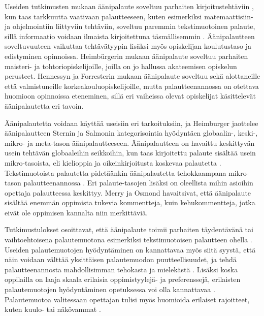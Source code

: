 \documentclass[utf8]{gradu3}
\begin{document}
Useiden tutkimusten mukaan äänipalaute soveltuu parhaiten kirjoitustehtäviin \parencite[][]{academics, engaging, using}, kun taas tarkkuutta vaativaan palautteeseen, kuten esimerkiksi matemaattisiin- ja ohjelmointiin liittyviin tehtäviin, soveltuu paremmin tekstimuotoinen palaute, sillä informaatio voidaan ilmaista kirjoitettuna täsmällisemmin \parencite[][]{academics}. Äänipalautteen soveltuvuuteen vaikuttaa tehtävätyypin lisäksi myös opiskelijan koulutustaso ja edistyminen opinnoissa. Heimbürgerin \parencite[][]{using} mukaan äänipalaute soveltuu parhaiten maisteri- ja tohtoriopiskelijoille, joilla on jo hallussa akateemisen opiskelun perusteet. Hennessyn ja Forresterin \parencite[][]{developing} mukaan äänipalaute soveltuu sekä alottaneille että valmistuneille korkeakouluopiskelijoille, mutta palautteenannossa on otettava huomioon opinnoissa eteneminen, sillä eri vaiheissa olevat opiskelijat käsittelevät äänipalautetta eri tavoin.

Äänipalautetta voidaan käyttää useisiin eri tarkoituksiin, ja Heimburger \parencite[][]{using} jaottelee äänipalautteen Sternin ja Salmonin \parencite[][]{stern} kategorisointia hyödyntäen globaalin-, keski-, mikro- ja meta-tason äänipalautteeseen. Äänipalautteen on havaittu keskittyvän usein tehtävän globaaleihin seikkoihin, kun taas kirjoitettu palaute sisältää usein mikro-tasoista, eli kielioppia ja oikeinkirjoitusta koskevaa palautetta \parencite[][]{versus}. Tekstimuotoista palautetta pidetäänkin äänipalautetta tehokkaampana mikro-tason palautteenannossa \parencite[][]{ice}. Eri palaute-tasojen lisäksi on oleellista mihin asioihin opettaja palautteessa keskittyy. Merry ja Osmond \parencite[][]{attitudes} havaitsivat, että äänipalaute sisältää enemmän oppimista tukevia kommentteja, kuin kehukommentteja, jotka eivät ole oppimisen kannalta niin merkittäviä.

Tutkimustulokset osoittavat, että äänipalaute toimii parhaiten täydentävänä  tai vaihtoehtoisena palautemuotona esimerkiksi tekstimuotoisen palautteen ohella \parencite[][]{academics, modes, ice}. Useiden palautemuotojen hyödyntäminen on kannattavaa myös siitä syystä, että näin voidaan välttää yksittäisen palautemuodon puutteellisuudet, ja tehdä palautteenannosta mahdollisimman tehokasta ja mielekästä \parencite[][]{modes}. Lisäksi koska oppilailla on laaja skaala erilaisia oppimistyylejä- ja preferenssejä, erilaisten palautemuotojen hyödyntäminen opetuksessa voi olla kannattavaa \parencite[][]{style}. Palautemuotoa valitessaan opettajan tulisi myös huomioida erilaiset rajoitteet, kuten kuulo- tai näkövammat \parencite[][]{evaluating}.
\end{document}
